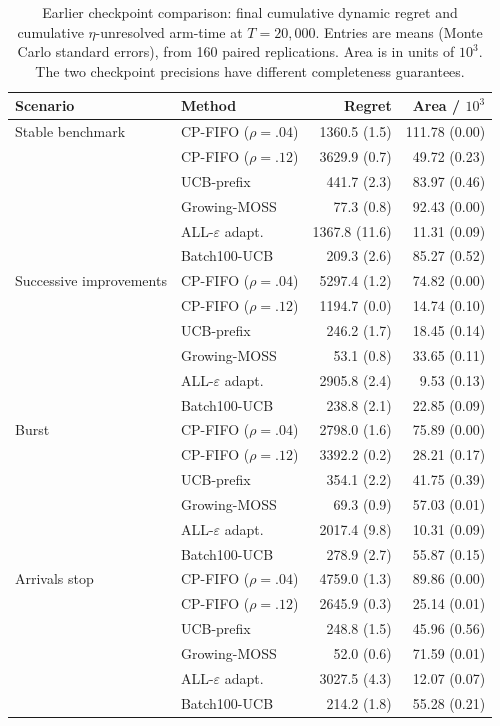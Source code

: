 \documentclass[11pt]{article}
\theoremstyle{remark}
\begin{document}
\begin{table}[t]
\centering
\caption{Earlier checkpoint comparison: final cumulative dynamic regret and cumulative $\eta$-unresolved arm-time at $T=20{,}000$. Entries are means (Monte Carlo standard errors), from 160 paired replications. Area is in units of $10^3$. The two checkpoint precisions have different completeness guarantees.}
\label{tab:simulation}
\label{tab:legacy-checkpoint}
\small
\begin{tabular}{llrr}
\toprule
Scenario & Method & Regret & Area / $10^3$ \\
\midrule
Stable benchmark & CP-FIFO ($\rho=.04$) & 1360.5 (1.5) & 111.78 (0.00) \\
 & CP-FIFO ($\rho=.12$) & 3629.9 (0.7) & 49.72 (0.23) \\
 & UCB-prefix & 441.7 (2.3) & 83.97 (0.46) \\
 & Growing-MOSS & 77.3 (0.8) & 92.43 (0.00) \\
 & ALL-$\varepsilon$ adapt. & 1367.8 (11.6) & 11.31 (0.09) \\
 & Batch100-UCB & 209.3 (2.6) & 85.27 (0.52) \\
\midrule
Successive improvements & CP-FIFO ($\rho=.04$) & 5297.4 (1.2) & 74.82 (0.00) \\
 & CP-FIFO ($\rho=.12$) & 1194.7 (0.0) & 14.74 (0.10) \\
 & UCB-prefix & 246.2 (1.7) & 18.45 (0.14) \\
 & Growing-MOSS & 53.1 (0.8) & 33.65 (0.11) \\
 & ALL-$\varepsilon$ adapt. & 2905.8 (2.4) & 9.53 (0.13) \\
 & Batch100-UCB & 238.8 (2.1) & 22.85 (0.09) \\
\midrule
Burst & CP-FIFO ($\rho=.04$) & 2798.0 (1.6) & 75.89 (0.00) \\
 & CP-FIFO ($\rho=.12$) & 3392.2 (0.2) & 28.21 (0.17) \\
 & UCB-prefix & 354.1 (2.2) & 41.75 (0.39) \\
 & Growing-MOSS & 69.3 (0.9) & 57.03 (0.01) \\
 & ALL-$\varepsilon$ adapt. & 2017.4 (9.8) & 10.31 (0.09) \\
 & Batch100-UCB & 278.9 (2.7) & 55.87 (0.15) \\
\midrule
Arrivals stop & CP-FIFO ($\rho=.04$) & 4759.0 (1.3) & 89.86 (0.00) \\
 & CP-FIFO ($\rho=.12$) & 2645.9 (0.3) & 25.14 (0.01) \\
 & UCB-prefix & 248.8 (1.5) & 45.96 (0.56) \\
 & Growing-MOSS & 52.0 (0.6) & 71.59 (0.01) \\
 & ALL-$\varepsilon$ adapt. & 3027.5 (4.3) & 12.07 (0.07) \\
 & Batch100-UCB & 214.2 (1.8) & 55.28 (0.21) \\
\bottomrule
\end{tabular}
\end{table}
\end{document}
